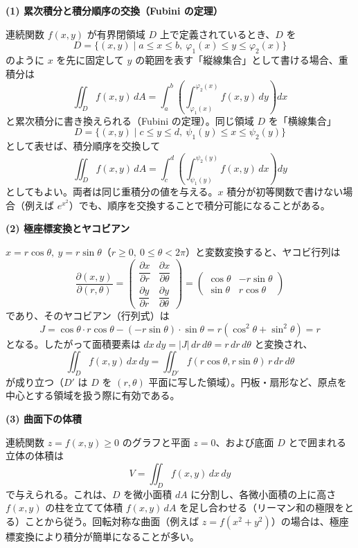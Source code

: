 \documentclass[a4paper,11pt]{article}
\begin{document}


\noindent
\textbf{(1) 累次積分と積分順序の交換（Fubini の定理）}

\noindent
連続関数 $f(x,y)$ が有界閉領域 $D$ 上で定義されているとき、$D$ を
\[
D = \{(x,y) \mid a \le x \le b,\ \varphi_1(x) \le y \le \varphi_2(x)\}
\]
のように $x$ を先に固定して $y$ の範囲を表す「縦線集合」として書ける場合、重積分は
\[
\iint_{D} f(x,y)\,dA = \int_{a}^{b}\left(\int_{\varphi_1(x)}^{\varphi_2(x)} f(x,y)\,dy\right)dx
\]
と累次積分に書き換えられる（Fubini の定理）。同じ領域 $D$ を「横線集合」
\[
D = \{(x,y) \mid c \le y \le d,\ \psi_1(y) \le x \le \psi_2(y)\}
\]
として表せば、積分順序を交換して
\[
\iint_{D} f(x,y)\,dA = \int_{c}^{d}\left(\int_{\psi_1(y)}^{\psi_2(y)} f(x,y)\,dx\right)dy
\]
としてもよい。両者は同じ重積分の値を与える。$x$ 積分が初等関数で書けない場合（例えば $e^{x^2}$）でも、順序を交換することで積分可能になることがある。

\bigskip
\noindent
\textbf{(2) 極座標変換とヤコビアン}

\noindent
$x = r\cos\theta,\ y = r\sin\theta$（$r \ge 0,\ 0 \le \theta < 2\pi$）と変数変換すると、ヤコビ行列は
\[
\frac{\partial(x,y)}{\partial(r,\theta)} =
\begin{pmatrix}
\dfrac{\partial x}{\partial r} & \dfrac{\partial x}{\partial \theta} \\[4pt]
\dfrac{\partial y}{\partial r} & \dfrac{\partial y}{\partial \theta}
\end{pmatrix}
=
\begin{pmatrix}
\cos\theta & -r\sin\theta \\
\sin\theta & r\cos\theta
\end{pmatrix}
\]
であり、そのヤコビアン（行列式）は
\[
J = \cos\theta \cdot r\cos\theta - (-r\sin\theta)\cdot\sin\theta = r(\cos^{2}\theta + \sin^{2}\theta) = r
\]
となる。したがって面積要素は $dx\,dy = |J|\,dr\,d\theta = r\,dr\,d\theta$ と変換され、
\[
\iint_{D} f(x,y)\,dx\,dy = \iint_{D'} f(r\cos\theta, r\sin\theta)\, r\,dr\,d\theta
\]
が成り立つ（$D'$ は $D$ を $(r,\theta)$ 平面に写した領域）。円板・扇形など、原点を中心とする領域を扱う際に有効である。

\bigskip
\noindent
\textbf{(3) 曲面下の体積}

\noindent
連続関数 $z = f(x,y) \ge 0$ のグラフと平面 $z=0$、および底面 $D$ とで囲まれる立体の体積は
\[
V = \iint_{D} f(x,y)\,dx\,dy
\]
で与えられる。これは、$D$ を微小面積 $dA$ に分割し、各微小面積の上に高さ $f(x,y)$ の柱を立てて体積 $f(x,y)\,dA$ を足し合わせる（リーマン和の極限をとる）ことから従う。回転対称な曲面（例えば $z = f(x^2+y^2)$）の場合は、極座標変換により積分が簡単になることが多い。
\end{document}
